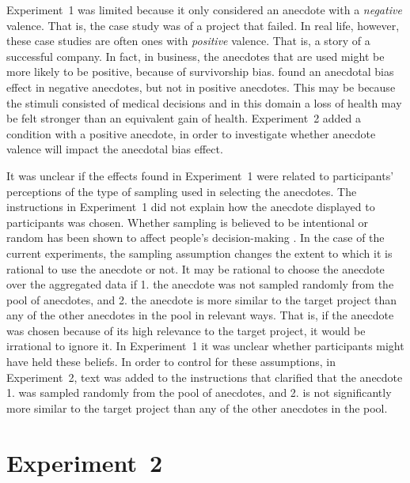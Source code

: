 \documentclass[a4paper, nobind, dvipsnames]{templates/ociamthesis}
\theoremstyle{definition}
\theoremstyle{definition}
\theoremstyle{definition}
\theoremstyle{definition}
\theoremstyle{remark}
\begin{document}
Experiment~1 was limited because it only considered an anecdote with a
\emph{negative} valence. That is, the case study was of a project that failed. In
real life, however, these case studies are often ones with \emph{positive} valence.
That is, a story of a successful company. In fact, in business, the anecdotes
that are used might be more likely to be positive, because of survivorship bias.
\textcite{jaramillo2019} found an anecdotal bias effect in negative anecdotes, but not in
positive anecdotes. This may be because the stimuli consisted of medical
decisions and in this domain a loss of health may be felt stronger than an
equivalent gain of health. Experiment~2 added a condition with a positive
anecdote, in order to investigate whether anecdote valence will impact the
anecdotal bias effect.

It was unclear if the effects found in Experiment~1 were related to
participants' perceptions of the type of sampling used in selecting the
anecdotes. The instructions in Experiment~1 did not explain how the anecdote
displayed to participants was chosen. Whether sampling is believed to be
intentional or random has been shown to affect people's decision-making \autocite[e.g.,][]{hayes2019}. In the case of the current experiments, the sampling assumption
changes the extent to which it is rational to use the anecdote or not. It may be
rational to choose the anecdote over the aggregated data if 1. the anecdote was
not sampled randomly from the pool of anecdotes, and 2. the anecdote is more
similar to the target project than any of the other anecdotes in the pool in
relevant ways. That is, if the anecdote was chosen because of its high relevance
to the target project, it would be irrational to ignore it. In Experiment~1 it
was unclear whether participants might have held these beliefs. In order to
control for these assumptions, in Experiment~2, text was added to the
instructions that clarified that the anecdote 1. was sampled randomly from the
pool of anecdotes, and 2. is not significantly more similar to the target
project than any of the other anecdotes in the pool.

\hypertarget{anecdotes-2}{%
\section{Experiment~2}\label{anecdotes-2}}
\end{document}
